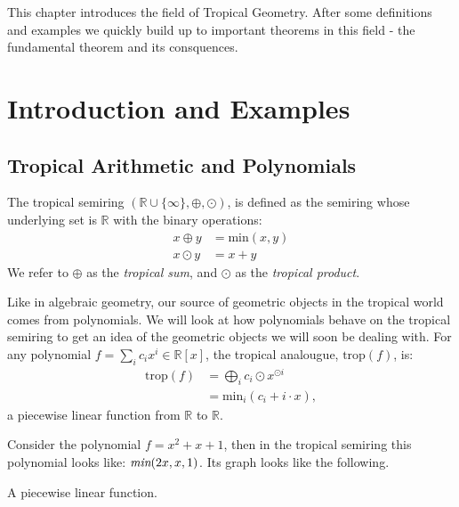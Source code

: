 This chapter introduces the field of Tropical Geometry. 
After some definitions and examples we quickly build up to important theorems in this field - the fundamental theorem and its consquences.
\section{Introduction and Examples}
\subsection{Tropical Arithmetic and Polynomials}
    \begin{definition} The tropical semiring $(\mathbb{R} \cup \{\infty\}, \oplus, \odot)$, is defined as the semiring whose underlying set is $\mathbb{R}$ with the binary operations: 
        \begin{align*}
            x \oplus y &= \text{min}(x,y)\\
            x \odot y  &= x + y
        \end{align*}
    We refer to $\oplus$ as the \textit{tropical sum}, and $\odot$ as the \textit{tropical product}. 
    \end{definition}

Like in algebraic geometry, our source of geometric objects in the tropical world comes from polynomials.
We will look at how polynomials behave on the tropical semiring to get an idea of the geometric objects we will soon be dealing with.
For any polynomial $f  = \sum_{i}c_{i}x^{i}\in \mathbb{R}[x]$, the tropical analougue, $\text{trop}(f)$, is:
\begin{align*}
    \text{trop}(f) &= \bigoplus_{i}c_{i}\odot x^{\odot i}\\
                   &= \text{min}_{i}(c_{i} + i \cdot x),
\end{align*}
a piecewise linear function from $\mathbb{R}$ to $\mathbb{R}$.

\begin{example}
    Consider the polynomial $f = x^{2} + x + 1$, then in the tropical semiring this polynomial looks like: $\emph{min}(2x,x,1)$. Its graph looks like the following.
    \begin{center}
    \end{center}
    A piecewise linear function.
\end{example}

